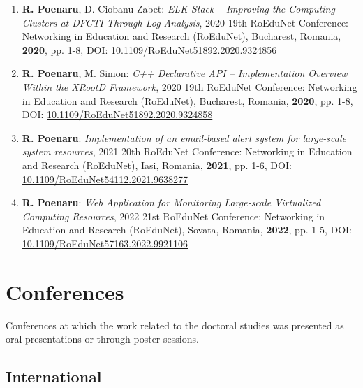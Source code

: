 \begin{enumerate}
    \item \textbf{R. Poenaru}, D. Ciobanu-Zabet: \emph{ELK Stack – Improving the Computing Clusters at DFCTI Through Log Analysis}, 2020 19th RoEduNet Conference: Networking in Education and Research (RoEduNet), Bucharest, Romania, \textbf{2020}, pp. 1-8, DOI: \href{https://ieeexplore.ieee.org/abstract/document/9324856}{10.1109/RoEduNet51892.2020.9324856}
    \item \textbf{R. Poenaru}, M. Simon: \emph{C++ Declarative API – Implementation Overview Within the XRootD Framework}, 2020 19th RoEduNet Conference: Networking in Education and Research (RoEduNet), Bucharest, Romania, \textbf{2020}, pp. 1-8, DOI: \href{https://ieeexplore.ieee.org/abstract/document/9324858}{10.1109/RoEduNet51892.2020.9324858}
    \item \textbf{R. Poenaru}: \emph{Implementation of an email-based alert system for large-scale system resources}, 2021 20th RoEduNet Conference: Networking in Education and Research (RoEduNet), Iasi, Romania, \textbf{2021}, pp. 1-6, DOI: \href{https://ieeexplore.ieee.org/abstract/document/9638277}{10.1109/RoEduNet54112.2021.9638277}
    \item \textbf{R. Poenaru}: \emph{Web Application for Monitoring Large-scale Virtualized Computing Resources}, 2022 21st RoEduNet Conference: Networking in Education and Research (RoEduNet), Sovata, Romania, \textbf{2022}, pp. 1-5, DOI: \href{https://ieeexplore.ieee.org/abstract/document/9921106}{10.1109/RoEduNet57163.2022.9921106}
\end{enumerate}

\section{Conferences}

Conferences at which the work related to the doctoral studies was presented as oral presentations or through poster sessions.

\subsection{International}

